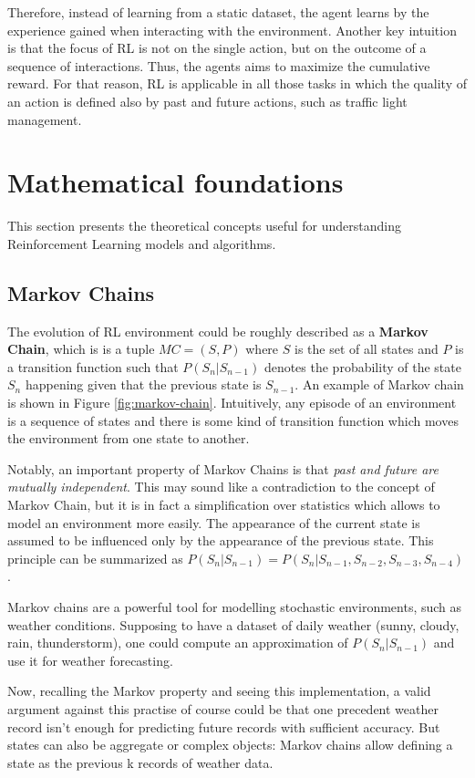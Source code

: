 Therefore, instead of learning from a static dataset, the agent learns by the experience gained when interacting with the environment.
Another key intuition is that the focus of RL is not on the single action, but on the outcome of a sequence of interactions. Thus, the agents aims to maximize the cumulative reward.
For that reason, RL is applicable in all those tasks in which the quality of an action is defined also by past and future actions, such as traffic light management.

\section{Mathematical foundations}

This section presents the theoretical concepts useful for understanding Reinforcement Learning models and algorithms.

\subsection{Markov Chains}

The evolution of RL environment could be roughly described as a \textbf{Markov Chain}, which is is a tuple $MC = (S, P)$ where $S$ is the set of all states and $P$ is a transition function such that $P(S_n | S_{n-1})$ denotes the probability of the state $S_n$ happening given that the previous state is $S_{n-1}$. An example of Markov chain is shown in Figure \ref{fig:markov-chain}. Intuitively, any episode of an environment is a sequence of states and there is some kind of transition function which moves the environment from one state to another.

Notably, an important property of Markov Chains is that \textit{past and future are mutually independent}. This may sound like a contradiction to the concept of Markov Chain, but it is in fact a simplification over statistics which allows to model an environment more easily. The appearance of the current state is assumed to be influenced only by the appearance of the previous state. This principle can be summarized as $P(S_n | S_{n-1}) = P(S_n | S_{n-1}, S_{n-2}, S_{n-3}, S_{n-4})$.

Markov chains are a powerful tool for modelling stochastic environments, such as weather conditions. Supposing to have a dataset of daily weather (sunny, cloudy, rain, thunderstorm), one could compute an approximation of $P(S_n | S_{n-1})$ and use it for weather forecasting.

Now, recalling the Markov property and seeing this implementation, a valid argument against this practise of course could be that one precedent weather record isn't enough for predicting future records with sufficient accuracy. But states can also be aggregate or complex objects: Markov chains allow defining a state as the previous k records of weather data.

